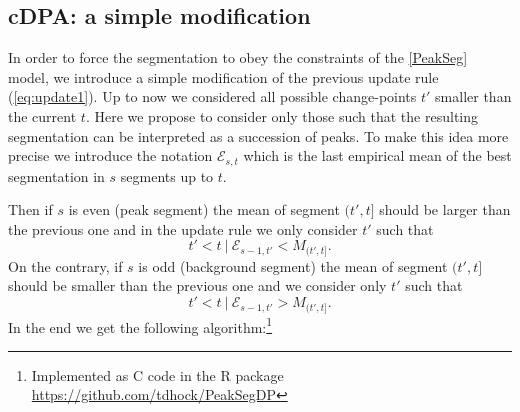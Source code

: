 \documentclass{article}
\begin{document}
\subsection{cDPA: a simple modification}
\label{sec:constrained-dp}

In order to force the segmentation to obey the constraints of the
\ref{PeakSeg} model, we introduce a simple modification of the
previous update rule (\ref{eq:update1}). %
Up to now we considered all possible change-points $t'$ smaller than
the current $t$. Here we propose to consider only those such that the
resulting segmentation can be interpreted as a succession of
peaks. To make this idea more precise we introduce the notation
$\mathcal{E}_{s,t}$ which is the last empirical mean of the best
segmentation in $s$ segments up to $t$.  

Then if $s$ is even (peak segment) the mean of segment $(t', t]$
should be larger than the previous one and in the update rule we only
consider $t'$ such that
\begin{equation}
  \label{eq:even}
   t' < t \ | \ \mathcal{E}_{s-1,t'} < M_{(t', t]}.
\end{equation}
On the contrary, if $s$ is odd (background segment) the mean of
segment $(t', t]$ should be smaller than the previous one and we
consider only $t'$ such that
\begin{equation}
  \label{eq:odd}
   t' < t \ | \ \mathcal{E}_{s-1,t'} > M_{(t', t]}.
\end{equation}
In the end we get the following algorithm:\footnote{Implemented as C
  code in the R package\\ \url{https://github.com/tdhock/PeakSegDP}}
\newcommand{\SWITCH}[1]{\STATE \textbf{switch} (#1)\begin{ALC@g}}
\newcommand{\ENDSWITCH}{\end{ALC@g}\STATE \textbf{end switch}}
\newcommand{\CASE}[2]{\STATE \textbf{case} #1\textbf{: } #2}%
\newcommand{\ENDCASE}{}%
\newcommand{\DEFAULT}[1]{\STATE \textbf{default: } \begin{ALC@g}}
\newcommand{\ENDDEFAULT}{\end{ALC@g}\STATE \textbf{end default} }
\newcommand{\FORFOR}[2]{\STATE \textbf{For} #1 \textbf{do} and \textbf{For} #2 \textbf{do} \begin{ALC@g}}
\newcommand{\ENDFORFOR}{\end{ALC@g}\STATE \textbf{End for} and \textbf{End for}  }
\end{document}
